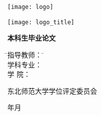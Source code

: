 %
\thispagestyle{empty}
%
\vspace{5mm}
%
\begin{center}
   \texttt{[image: logo]}
\end{center}
%
\vspace{2mm}
%
\begin{center}
  \texttt{[image: logo\_title]}
\end{center}
%
\vspace{10mm}
%
\centerline{\yihao \textbf{本科生毕业论文}}
%
\vspace{20mm}
%
\centerline{\sanhao \heiti \nstitlec}
%
\centerline{\sanhao \textbf{\nstitlee}}
%
\vspace{20mm}
%
\centerline{ \sihao\heiti\nsauthornamec}
%
\begin{tabbing}
    \hspace{30mm}
              \= \sihao 指导教师： \= \makebox[6cm]{\sihao\heiti\nsmentorc \nsmentortitle} \\[2mm]
              \> \sihao 学科专业： \> \makebox[6cm]{\sihao\heiti\nsmajorc} \\[2mm]
              \> \sihao 学    院： \> \makebox[6cm]{\sihao\heiti\nscollegec} \\[2mm]
\end{tabbing}
%
\vspace{20mm}
%
\centerline{东北师范大学学位评定委员会}
\centerline{\makebox[1cm]{\nsdateyear}年\makebox[1cm]{\nsdatemonth}月}
%
